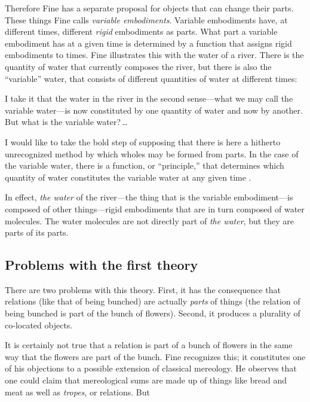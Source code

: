 \documentclass[11pt]{article}
\newenvironment{squote}{%
\begin{spacing}{1}
\begin{list}{}{%
\setlength{\labelwidth}{0pt}%
\rightmargin\leftmargin%
}
\item\relax
}{%
\end{list}%
\end{spacing}
}
\begin{document}
\begin{spacing}{1.5}
Therefore Fine has a separate proposal for objects that can change
their parts.  These things Fine calls {\em variable embodiments}.
Variable embodiments have, at different times, different {\em rigid}
embodiments as parts.  What part a variable embodiment has at a given
time is determined by a function that assigns rigid embodiments to
times.  Fine illustrates this with the water of a river.  There is the
quantity of water that currently composes the river, but there is also
the ``variable'' water, that consists of different quantities of water
at different times:

\begin{squote}
I take it that the water in the river in the second sense---what we may
call the variable water---is now constituted by one quantity of water
and now by another. But what is the variable water?\,\ldots

I would like to take the bold step of supposing that there is here a
hitherto unrecognized method by which wholes may be formed from parts.
In the case of the variable water, there is a function, or
``principle,'' that determines which quantity of water constitutes the
variable water at any given time \citeyearpar[68]{fine1999}.
\end{squote}

In effect, {\em the water} of the river---the thing that is the
variable embodiment---is composed of other things---rigid embodiments
that are in turn composed of water molecules.  The water molecules are
not directly part of {\em the water}, but they are parts of its parts.

\subsection{Problems with the first theory}
\label{problems1}
There are two problems with this theory.  First, it has the
consequence that relations (like that of being bunched) are actually
{\em parts} of things (the relation of being bunched is part of the
bunch of flowers).  Second, it produces a plurality of co-located
objects.

It is certainly not true that a relation is part of a bunch of flowers
in the same way that the flowers are part of the bunch.  Fine
recognizes this; it constitutes one of his objections to a possible
extension of classical mereology.  He observes that one could claim
that mereological sums are made up of things like bread and meat as
well as {\em tropes}, or relations.  But


\end{spacing}
\end{document}

